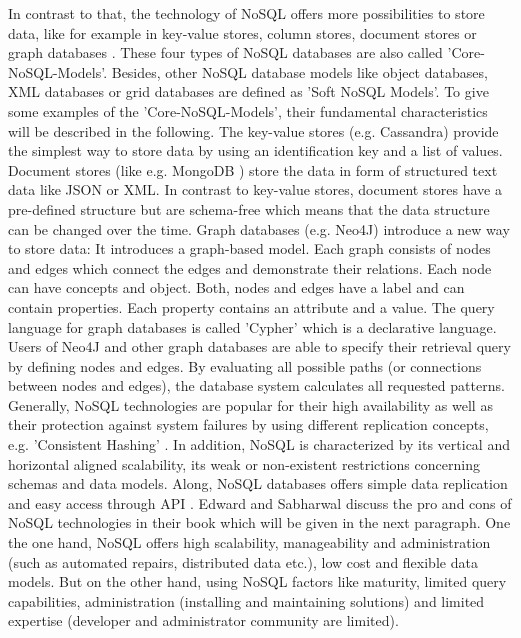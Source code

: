 In contrast to that, the technology of NoSQL offers more possibilities to store data, like for example in key-value stores, column stores, document stores or graph databases \cite[p.16 ff.]{nosql_meier}. These four types of NoSQL databases are also called 'Core-NoSQL-Models'. Besides, other NoSQL database models like object databases, \ac{XML} databases or grid databases are defined as 'Soft NoSQL Models'. 
To give some examples of the 'Core-NoSQL-Models', their fundamental characteristics will be described in the following. The key-value stores (e.g. Cassandra) provide the simplest way to store data by using an identification key and a list of values. Document stores (like e.g. MongoDB \pageref{mongodb}) store the data in form of structured text data like \ac{JSON} or XML. In contrast to key-value stores, document stores have a pre-defined structure but are schema-free which means that the data structure can be changed over the time. Graph databases (e.g. Neo4J) introduce a new way to store data: It introduces a graph-based model. Each graph consists of nodes and edges which connect the edges and demonstrate their relations. Each node can have concepts and object. Both, nodes and edges have a label and can contain properties. Each property contains an attribute and a value. The query language for graph databases is called 'Cypher' \cite[p.16 ff.]{nosql_meier} which is a declarative language. Users of Neo4J and other graph databases are able to specify their retrieval query by defining nodes and edges. By evaluating all possible paths (or connections between nodes and edges), the database system calculates all requested patterns.   
Generally, NoSQL technologies are popular for their high availability as well as their protection against system failures by using different replication concepts, e.g. 'Consistent Hashing' \cite[p.11 ff.]{nosql_meier}. In addition, NoSQL is characterized by its vertical and horizontal aligned scalability, its weak or non-existent restrictions concerning schemas and data models. Along, NoSQL databases offers simple data replication and easy access through API \cite[p.221 ff.]{nosql_meier}.  
Edward and Sabharwal discuss the pro and cons of NoSQL technologies in their book \cite[p.17 ff.]{mongodb_edward} which will be given in the next paragraph.
One the one hand, NoSQL offers high scalability, manageability and administration (such as automated repairs, distributed data etc.), low cost and flexible data models. But on the other hand, using NoSQL factors like maturity, limited query capabilities, administration (installing and maintaining solutions) and limited expertise (developer and administrator community are limited).


